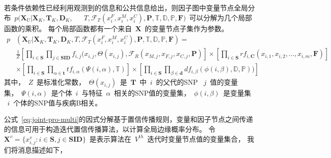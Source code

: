 若条件依赖性已经利用观测到的信息和公共信息给出，则因子图中变量节点全局分布~$p(\mathbf{X}_U | \mathbf{X}_K, \mathbf{T}_K,\mathbf{D}_K,~$~ ~$T, \mathcal{F}_T(x_i^F, x_i^M, x_i^C), \mathbf{P}, \mathbb{T}, \mathbb{D}, \mathbb{P}, \mathbf{F})$~可以分解为几个局部函数的乘积。 每个局部函数都有一个来自~$\mathbf{X}$~的变量节点子集作为参数。
\begin{equation}\label{eq:joint-pro-multi}
\begin{aligned}
p&(\mathbf{X}_U | \mathbf{X}_K, \mathbf{T}_K, \mathbf{D}_K, T, \mathcal{F}_T(x_i^F,x_i^M,x_i^C), \mathbf{P}, \mathbb{T}, \mathbb{D}, \mathbb{P}, \mathbf{F}) =   \\
& \frac{1}{Z}[\prod_{i \in \mathbf{S}} \prod_{j \in \mathbf{SID}} f_{i,j}(x_{i,j}, \Theta(x_{i,j}),\mathcal{F}_{R}(x_{M,j},x_{F,j}, x_{C,j},\mathbf{P})] \times [\prod_{i \in \mathbf{S}}rf_{i,\mathbf{C}}(x_{i,1},x_{i,2},...,x_{i,m},\mathbf{F})]  \\
&  \times [\prod_{i \in \mathbf{S}}\prod_{\alpha \in \mathbf{t}}tf_{i,\alpha}(\Psi(i,\alpha),\mathbb{T})] \times [\prod_{i \in \mathbf{S}}\prod_{\beta \in \mathbf{d}}df_{i,\beta}(\phi(i,\beta),\mathbb{D},\mathbb{P}))]
\end{aligned}
\end{equation}
其中，~$Z$~是标准化常数，~$\Theta(x_{i,j})$~是~$\mathbf{T}$~中~$i$~的父代的SNP ~$j$~值的变量集，~$\Psi(i,\alpha)$~是个体~$i$~与特征~$\alpha$~相关的SNP值的变量集，~$\phi(i,\beta)$~是变量集 ~$i$~个体的SNP值与疾病B相关。

公式~\ref{eq:joint-pro-multi}的因式分解基于置信传播规则，变量和因子节点之间传递的信息可用于构造迭代置信传播算法，以计算全局边缘概率分布。 令~$\mathbf{X}^v=\{x_{i,j}^v: i\in \mathbf{S}, j \in \mathbf{SID}\}$~是表示算法在~$V^{th}$~迭代时变量节点值的变量集合， 我们将消息描述如下，

